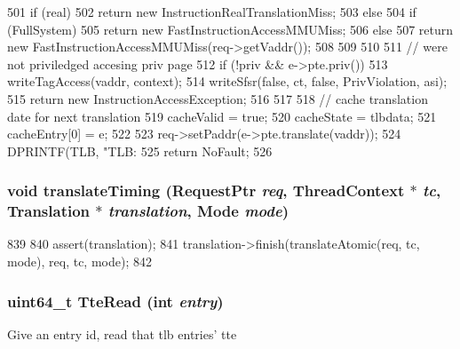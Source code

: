 \begin{DoxyCode}
{{501         if (real) {
502             return new InstructionRealTranslationMiss;
503         } else {
504             if (FullSystem)
505                 return new FastInstructionAccessMMUMiss;
506             else
507                 return new FastInstructionAccessMMUMiss(req->getVaddr());
508         }
509     }
510 
511     // were not priviledged accesing priv page
512     if (!priv && e->pte.priv()) {
513         writeTagAccess(vaddr, context);
514         writeSfsr(false, ct, false, PrivViolation, asi);
515         return new InstructionAccessException;
516     }
517 
518     // cache translation date for next translation
519     cacheValid = true;
520     cacheState = tlbdata;
521     cacheEntry[0] = e;
522 
523     req->setPaddr(e->pte.translate(vaddr));
524     DPRINTF(TLB, "TLB: %
525     return NoFault;
526 }
\end{DoxyCode}
\hypertarget{classSparcISA_1_1TLB_ae52f7e465748883695d2b4f432a13652}{
\subsubsection[{translateTiming}]{\setlength{\rightskip}{0pt plus 5cm}void translateTiming ({\bf RequestPtr} {\em req}, \/  {\bf ThreadContext} $\ast$ {\em tc}, \/  {\bf Translation} $\ast$ {\em translation}, \/  {\bf Mode} {\em mode})}}
\label{classSparcISA_1_1TLB_ae52f7e465748883695d2b4f432a13652}



\begin{DoxyCode}
839 {
840     assert(translation);
841     translation->finish(translateAtomic(req, tc, mode), req, tc, mode);
842 }
\end{DoxyCode}
\hypertarget{classSparcISA_1_1TLB_a62b717ca770fe6713cdde68d76694f44}{
\subsubsection[{TteRead}]{\setlength{\rightskip}{0pt plus 5cm}uint64\_\-t TteRead (int {\em entry})}}
\label{classSparcISA_1_1TLB_a62b717ca770fe6713cdde68d76694f44}
Give an entry id, read that tlb entries' tte 


